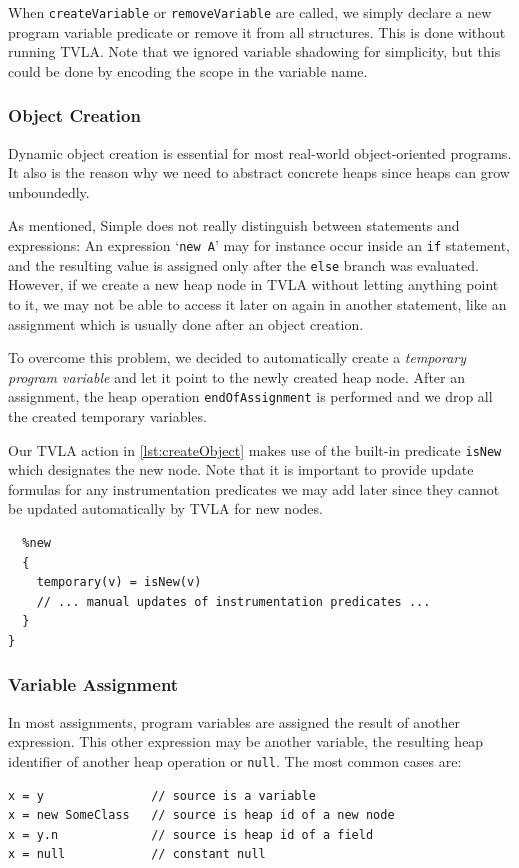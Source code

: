 \documentclass[11pt,a4paper,english]{article}
\begin{document}
When \texttt{createVariable} or \texttt{removeVariable} are called, we simply
declare a new program variable predicate or remove it from all structures. This
is done without running TVLA. Note that we ignored variable shadowing for
simplicity, but this could be done by encoding the scope in the variable name.

\subsubsection{Object Creation}
Dynamic object creation is essential for most real-world object-oriented programs. It also is the reason why we need to abstract concrete heaps since heaps can grow
unboundedly.  

As mentioned, Simple does not really distinguish between statements and expressions: An
expression  `\lstinline!new A!' may for instance occur inside an \texttt{if}
statement, and the resulting value is assigned only after the \texttt{else}
branch was evaluated. However, if we create a new heap node in TVLA without
letting anything point to it, we may not be able to access it later on again in
another statement, like an assignment which is usually done after an object
creation.  

To overcome this problem, we decided to automatically create a \textit{temporary
program variable} and let it point to the newly created heap node. After an
assignment, the heap operation \texttt{endOfAssignment} is performed and we drop
all the created temporary variables.

Our TVLA action in \autoref{lst:createObject} makes use of the built-in
predicate \texttt{isNew} which designates the new node. Note that it is
important to provide update formulas for any instrumentation predicates we may
add later since they cannot be updated automatically by TVLA for new nodes.

\begin{lstlisting}[language=tvp,caption={Action for Object Creation},label=lst:createObject]
%action createObject(temporary) {
  %new
  {
    temporary(v) = isNew(v)
    // ... manual updates of instrumentation predicates ... 
  }
}
\end{lstlisting}

\subsubsection{Variable Assignment}
In most assignments, program variables are assigned the result of another
expression. This other expression may be another variable, the resulting heap
identifier of another heap operation or \texttt{null}. The most common cases are:
\begin{lstlisting}[caption={Variable Assignments},label=lst:varAssignExample]
x = y               // source is a variable
x = new SomeClass   // source is heap id of a new node
x = y.n             // source is heap id of a field
x = null            // constant null
\end{lstlisting}
\end{document}
